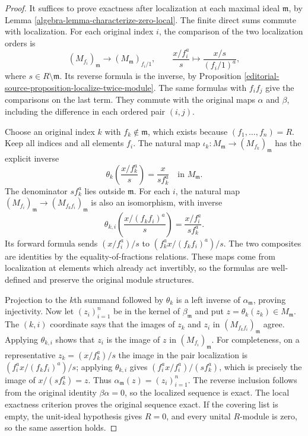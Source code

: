 \begin{proof}
It suffices to prove exactness after localization at each maximal
ideal $\mathfrak m$, by Lemma \ref{algebra-lemma-characterize-zero-local}.
The finite direct sums commute with localization. For each original
index $i$, the comparison of the two localization orders is
$$
(M_{f_i})_{\mathfrak m}\longrightarrow
(M_{\mathfrak m})_{f_i/1},\qquad
\frac{x/f_i^a}{s}\longmapsto\frac{x/s}{(f_i/1)^a},
$$
where $s\in R\setminus\mathfrak m$. Its reverse formula is the
inverse, by Proposition \ref{editorial-source-proposition-localize-twice-module}.
The same formulas with $f_if_j$ give the comparisons on the last term.
They commute with the original maps $\alpha$ and $\beta$, including
the difference in each ordered pair $(i,j)$.

\medskip\noindent
Choose an original index $k$ with $f_k\notin\mathfrak m$, which exists
because $(f_1,\ldots,f_n)=R$. Keep all indices and all elements $f_i$.
The natural map
$\iota_k:M_{\mathfrak m}\to(M_{f_k})_{\mathfrak m}$
has the explicit inverse
$$
\theta_k\left(\frac{x/f_k^a}{s}\right)=\frac{x}{sf_k^a}
\quad\text{in }M_{\mathfrak m}.
$$
The denominator $sf_k^a$ lies outside $\mathfrak m$.
For each $i$, the natural map
$(M_{f_i})_{\mathfrak m}\to(M_{f_kf_i})_{\mathfrak m}$
is also an isomorphism, with inverse
$$
\theta_{k,i}\left(\frac{x/(f_kf_i)^a}{s}\right)
=\frac{x/f_i^a}{sf_k^a}.
$$
Its forward formula sends $(x/f_i^a)/s$ to
$(f_k^ax/(f_kf_i)^a)/s$. The two composites are identities by
the equality-of-fractions relations. These maps come from localization
at elements which already act invertibly, so the formulas are
well-defined and preserve the original module structures.

\medskip\noindent
Projection to the $k$th summand followed by $\theta_k$ is a left
inverse of $\alpha_{\mathfrak m}$, proving injectivity.
Now let $(z_i)_{i=1}^n$ be in the kernel of $\beta_{\mathfrak m}$
and put $z=\theta_k(z_k)\in M_{\mathfrak m}$.
The $(k,i)$ coordinate says that the images of $z_k$ and $z_i$
in $(M_{f_kf_i})_{\mathfrak m}$ agree. Applying $\theta_{k,i}$
shows that $z_i$ is the image of $z$ in $(M_{f_i})_{\mathfrak m}$.
For completeness, on a representative $z_k=(x/f_k^a)/s$ the image
in the pair localization is $(f_i^ax/(f_kf_i)^a)/s$; applying
$\theta_{k,i}$ gives $(f_i^ax/f_i^a)/(sf_k^a)$, which is precisely
the image of $x/(sf_k^a)=z$. Thus
$\alpha_{\mathfrak m}(z)=(z_i)_{i=1}^n$.
The reverse inclusion follows from the original identity
$\beta\alpha=0$, so the localized sequence is exact.
The local exactness criterion proves the original sequence exact.
If the covering list is empty, the unit-ideal hypothesis gives $R=0$,
and every unital $R$-module is zero, so the same assertion holds.
\end{proof}


